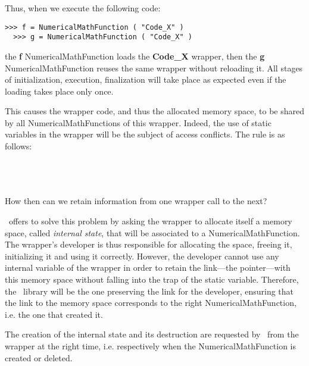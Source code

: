 Thus, when we execute the following code:

\lstset{language=C++, basicstyle=\normalsize}
\begin{lstlisting}[frame=TBRL]
  >>> f = NumericalMathFunction ( "Code_X" )
  >>> g = NumericalMathFunction ( "Code_X" )
\end{lstlisting}

the {\bf f} NumericalMathFunction loads the {\bf Code\_X} wrapper, then the {\bf g} NumericalMathFunction reuses the same wrapper without reloading it. All stages of initialization, execution, finalization will take place as expected even if the loading takes place only once.

This causes the wrapper code, and thus the allocated memory space, to be shared by all NumericalMathFunctions of this wrapper. Indeed, the use of static variables in the wrapper will be the subject of access conflicts. The rule is as follows:

\ \\
\ \\
\ \\

How then can we retain information from one wrapper call to the next?

\OT\ offers to solve this problem by asking the wrapper to allocate itself a memory space, called \emph{internal state}, that will be associated to a NumericalMathFunction. The wrapper's developer is thus responsible for allocating the space, freeing it, initializing it and using it correctly. However, the developer cannot use any internal variable of the wrapper in order to retain the link---the pointer---with this memory space without falling into the trap of the static variable. Therefore, the \OT\ library will be the one preserving the link for the developer, ensuring that the link to the memory space corresponds to the right NumericalMathFunction, i.e. the one that created it.

The creation of the internal state and its destruction are requested by \OT\ from the wrapper at the right time, i.e. respectively when the NumericalMathFunction is created or deleted.

